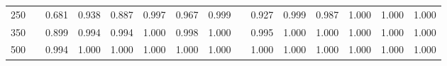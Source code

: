 % 
\begin{tabular}{ccccccccccccccc}
  \hline
  \hline
250 &  & 0.681 & 0.938 & 0.887 & 0.997 & 0.967 & 0.999 &  & 0.927 & 0.999 & 0.987 & 1.000 & 1.000 & 1.000 \\ 
  350 &  & 0.899 & 0.994 & 0.994 & 1.000 & 0.998 & 1.000 &  & 0.995 & 1.000 & 1.000 & 1.000 & 1.000 & 1.000 \\ 
  500 &  & 0.994 & 1.000 & 1.000 & 1.000 & 1.000 & 1.000 &  & 1.000 & 1.000 & 1.000 & 1.000 & 1.000 & 1.000 \\ 
   \hline
\end{tabular}
